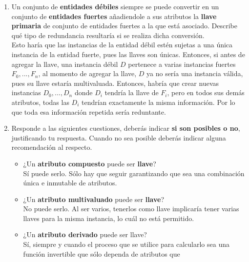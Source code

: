 \documentclass{article}
\begin{document}
    \begin{enumerate}[label = (\alph*)]
        \item {
            Un conjunto de \textbf{entidades débiles} siempre se puede convertir
            en un conjunto de \textbf{entidades fuertes} añadiendole a sus 
            atributos la \textbf{llave primaria} de conjunto de entidades fuertes
            a la que está asociado. Describe qué tipo de redundancia resultaría 
            si se realiza dicha conversión. \\
            Esto haría que las instancias de la entidad débil estén sujetas a 
            una única instancia de la entidad fuerte, pues las llaves son únicas. 
            Entonces, si antes de agregar la llave, una instancia débil $D$ 
            pertenece a varias instancias fuertes $F_0, ..., F_n$, al momento 
            de agregar la llave, $D$ ya no sería una instancia válida, pues su
            llave estaría multivaluada. Entonces, habría que crear nuevas 
            instancias $D_0, ..., D_n$ donde $D_i$ tendría la llave de $F_i$,
            pero en todos sus demás atributos, todas las $D_i$ tendrían 
            exactamente la misma información. Por lo que toda esa información 
            repetida sería reduntante.
        }
        \item {
            Responde a las siguientes cuestiones, deberás indicar 
            \textbf{si son posibles o no}, justificando tu respuesta. Cuando no 
            sea posible deberás indicar alguna recomendación al respecto.
            \begin{itemize}
                \item ¿Un \textbf{atributo compuesto} puede ser \textbf{llave}? \\
                    Sí puede serlo. Sólo hay que seguir garantizando que sea 
                    una combinación única e inmutable de atributos.
                \item ¿Un \textbf{atributo multivaluado} puede ser \textbf{llave}? \\
                    No puede serlo. Al ser varios, tenerlos como llave implicaría
                    tener varias llaves para la misma instancia, lo cuál no está
                    permitido.
                \item ¿Un \textbf{atributo derivado} puede ser llave? \\
                    Sí, siempre y cuando el proceso que se utilice para calcularlo
                    sea una función invertible que sólo dependa de atributos que 

\end{itemize}}
\end{enumerate}
\end{document}
